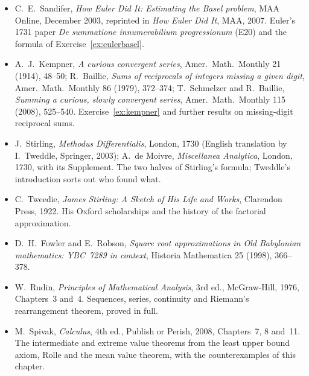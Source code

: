 \begin{itemize}
\item C.~E.~Sandifer, \emph{How Euler Did It: Estimating the Basel problem}, MAA Online, December 2003, reprinted in \emph{How Euler Did It}, MAA, 2007. Euler's 1731 paper \emph{De summatione innumerabilium progressionum} (E20) and the formula of Exercise~\ref{ex:eulerbasel}.
\item A.~J.~Kempner, \emph{A curious convergent series}, Amer.\ Math.\ Monthly 21 (1914), 48--50; R.~Baillie, \emph{Sums of reciprocals of integers missing a given digit}, Amer.\ Math.\ Monthly 86 (1979), 372--374; T.~Schmelzer and R.~Baillie, \emph{Summing a curious, slowly convergent series}, Amer.\ Math.\ Monthly 115 (2008), 525--540. Exercise~\ref{ex:kempner} and further results on missing-digit reciprocal sums.
\item J.~Stirling, \emph{Methodus Differentialis}, London, 1730 (English translation by I.~Tweddle, Springer, 2003); A.~de Moivre, \emph{Miscellanea Analytica}, London, 1730, with its Supplement. The two halves of Stirling's formula; Tweddle's introduction sorts out who found what.
\item C.~Tweedie, \emph{James Stirling: A Sketch of His Life and Works}, Clarendon Press, 1922. His Oxford scholarships and the history of the factorial approximation.
\item D.~H.~Fowler and E.~Robson, \emph{Square root approximations in Old Babylonian mathematics: YBC~7289 in context}, Historia Mathematica 25 (1998), 366--378.
\item W.~Rudin, \emph{Principles of Mathematical Analysis}, 3rd ed., McGraw-Hill, 1976, Chapters~3 and~4. Sequences, series, continuity and Riemann's rearrangement theorem, proved in full.
\item M.~Spivak, \emph{Calculus}, 4th ed., Publish or Perish, 2008, Chapters~7, 8 and~11. The intermediate and extreme value theorems from the least upper bound axiom, Rolle and the mean value theorem, with the counterexamples of this chapter.
\end{itemize}
